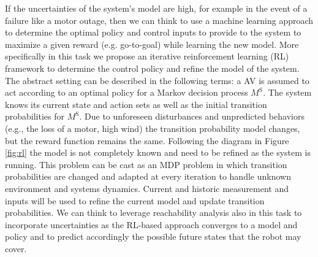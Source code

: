 If the uncertainties of the system's model are high, for example in the event of a failure like a motor outage, then we can think to use a machine learning approach to determine the optimal policy and control inputs to provide to the system to maximize a given reward (e.g. go-to-goal) while learning the new model.
More specifically in this task we propose an iterative reinforcement learning (RL) framework to determine the control policy and refine the model of the system. The abstract setting can be described in the following terms: a AV is assumed to act according to an optimal policy for a Markov decision process $M^{\mbox{S}}$. The system knows its current state and action sets as well as the initial transition probabilities for $M^{\mbox{S}}$. Due to unforeseen disturbances and unpredicted behaviors (e.g., the loss of a motor, high wind) the transition probability model changes, but the reward function remains the same. Following the diagram in Figure \ref{fig:rl} the model is not completely known and need to be refined as the system is running. This problem can be cast as an MDP problem in which transition probabilities are changed and adapted at every iteration to handle unknown environment and systems dynamics. Current and historic measurement and inputs will be used to refine the current model and update transition probabilities. We can think to leverage reachability analysis also in this task to incorporate uncertainties as the RL-based approach converges to a model and policy and to predict accordingly the possible future states that the robot may cover. 


